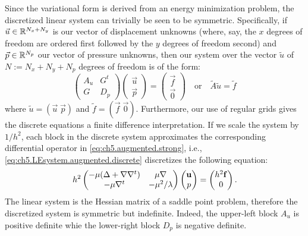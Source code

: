 Since the variational form is derived from an energy minimization problem, the discretized linear system can trivially be seen to be symmetric. Specifically, if $\vec{u} \in \mathbb{R}^{N_x + N_y}$ is our vector of displacement unknowns (where, say, the $x$ degrees of freedom are ordered first followed by the $y$ degrees of freedom second) and $\vec{p} \in \mathbb{R}^{N_p}$ our vector of pressure unknowns, then our system over the vector $\tilde{u}$ of $N := N_x + N_y + N_p$ degrees of freedom is of the form:
\begin{equation} \label{eq:ch5.LEsystem.augmented.discrete}
\begin{pmatrix} A_u & G^t \\ G & D_p \end{pmatrix}
\begin{pmatrix} \vec{u} \\ \vec{p} \end{pmatrix}
= \begin{pmatrix} \vec{f} \\ \vec{0} \end{pmatrix}
\quad \text{or} \quad \tilde{A} \tilde{u} = \tilde{f}
\end{equation}
where $\tilde{u} = (\vec{u} \; \vec{p})$ and $\tilde{f} = (\vec{f} \; \vec{0})$. Furthermore, our use of regular grids gives the discrete equations a finite difference interpretation. If we scale the system by $1/h^2$, each block in the discrete system approximates the corresponding differential operator in \eqref{eq:ch5.augmented.strong}, i.e., \eqref{eq:ch5.LEsystem.augmented.discrete} discretizes the following equation:
\begin{equation} \label{eq:ch5.LEsystem.augmented.continuous}
h^2 \begin{pmatrix} -\mu (\Delta + \nabla \nabla^t) & \mu \nabla \\ -\mu \nabla^t & -\mu^2/\lambda \end{pmatrix}
\begin{pmatrix} \mathbf{u} \\ p \end{pmatrix}
= \begin{pmatrix} h^2 \mathbf{f} \\ 0 \end{pmatrix}.
\end{equation}
The linear system is the Hessian matrix of a saddle point problem, therefore the discretized system is symmetric but indefinite. Indeed, the upper-left block $A_u$ is positive definite whie the lower-right block $D_p$ is negative definite.

